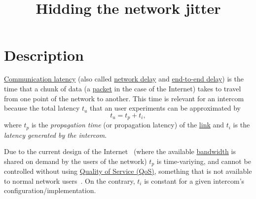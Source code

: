 
\title{Hidding the network jitter}

\maketitle

\section{Description}

\href{https://en.wikipedia.org/wiki/Latency_(engineering)#Communication_latency}{Communication
  latency} (also called
\href{https://en.wikipedia.org/wiki/Network_delay}{network delay} and
\href{https://en.wikipedia.org/wiki/End-to-end_delay}{end-to-end
  delay}) is the time that a chunk of data (a
\href{https://en.wikipedia.org/wiki/Network_packet}{packet} in the
case of the Internet) takes to travel from one point of the network to
another. This time is relevant for an intercom because the total
latency $t_u$ that an user experiments can be approximated by
\begin{equation}
  t_u = t_p + t_i,
  \label{eq:user_latency}
\end{equation}
where $t_p$ is the \emph{propagation time} (or propagation latency) of
the \href{https://en.wikipedia.org/wiki/Telecommunications_link}{link}
and $t_i$ is the \emph{latency generated by the intercom}.

Due to the current design of the Internet~\cite{Tanenbaum,Stallings} (where the
available
\href{https://en.wikipedia.org/wiki/Bandwidth_(computing)}{bandwidth}
is shared on demand by the users of the network) $t_p$ is
time-variying, and cannot be controlled without using
\href{https://en.wikipedia.org/wiki/Quality_of_service}{Quality of
  Service (QoS)}, something that is not available to normal network
users~\cite{dordal2020intro}. On the contrary, $t_i$ is constant for a
given intercom's configuration/implementation.

